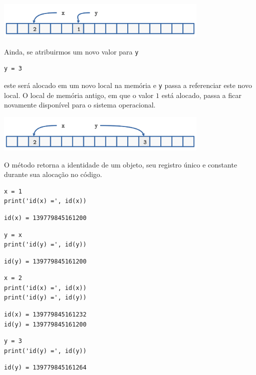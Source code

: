 \begin{center}
  \includegraphics[width=4in]{./cap_lingua/dados/fig_aloc_mem/xRecebe2.png}
\end{center}

Ainda, se atribuirmos um novo valor para \texttt{y}

\begin{lstlisting}
y = 3
\end{lstlisting}

este será alocado em um novo local na memória e \texttt{y} passa a referenciar este novo local. O local de memória antigo, em que o valor $1$ está alocado, passa a ficar novamente disponível para o sistema operacional.

\begin{center}
  \includegraphics[width=4in]{./cap_lingua/dados/fig_aloc_mem/yRecebe3.png}
\end{center}

\begin{obs}
  O método {\python} {\PYTHONid} retorna a identidade de um objeto, seu registro único e constante durante sua alocação no código.

\begin{lstlisting}
x = 1
print('id(x) =', id(x))
\end{lstlisting}

\begin{verbatim}
id(x) = 139779845161200
\end{verbatim}

\begin{lstlisting}
y = x
print('id(y) =', id(y))
\end{lstlisting}

\begin{verbatim}
id(y) = 139779845161200
\end{verbatim}

\begin{lstlisting}
x = 2
print('id(x) =', id(x))
print('id(y) =', id(y))
\end{lstlisting}

\begin{verbatim}
id(x) = 139779845161232
id(y) = 139779845161200
\end{verbatim}

\begin{lstlisting}
y = 3
print('id(y) =', id(y))
\end{lstlisting}

\begin{verbatim}
id(y) = 139779845161264
\end{verbatim}


\end{obs}


